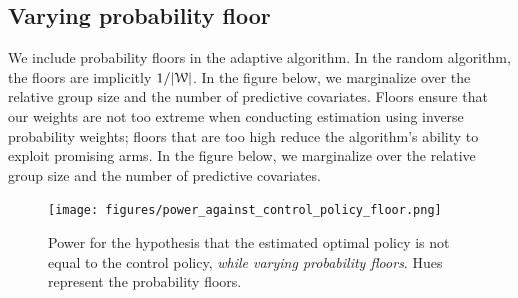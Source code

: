 \documentclass[letterpaper, 12pt, parskip=full,]{scrartcl}
\begin{document}
\subsection{Varying probability floor}
We include probability floors in the adaptive algorithm. In the random algorithm, the floors are implicitly $ 1/ |{\EuScript W}|$. In the figure below, we marginalize over the relative group size and the number of predictive covariates. Floors ensure that our weights are not too extreme when conducting estimation using inverse probability weights; floors that are too high reduce the algorithm's ability to exploit promising arms. In the figure below, we marginalize over the relative group size and the number of predictive covariates.  

\begin{figure}[H]
\centering
\texttt{[image: figures/power\_against\_control\_policy\_floor.png]}
\caption{Power for the hypothesis that the estimated optimal policy is not equal to the control policy, \textit{while varying probability floors}. Hues represent the probability floors. }
\label{fig:power_control_floor}
\end{figure}

%
%
\end{document}
